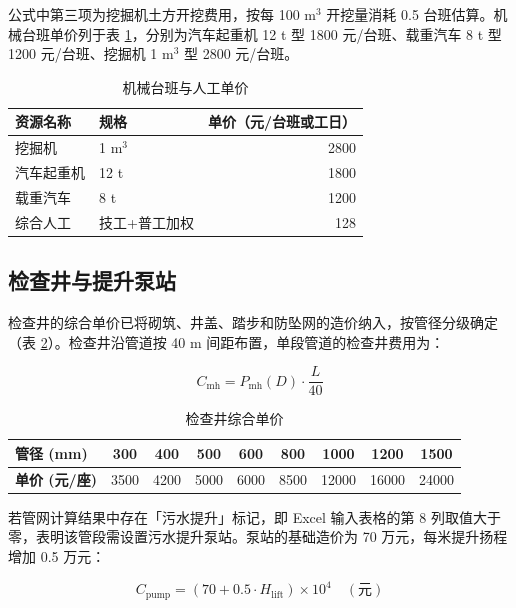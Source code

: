 \documentclass[12pt,a4paper]{ctexart}
\begin{document}
公式中第三项为挖掘机土方开挖费用，按每 100 m$^3$ 开挖量消耗 0.5 台班估算。机械台班单价列于表 \ref{tab:machine_price}，分别为汽车起重机 12 t 型 1800 元/台班、载重汽车 8 t 型 1200 元/台班、挖掘机 1 m$^3$ 型 2800 元/台班。

\begin{table}[htbp]
\centering
\caption{机械台班与人工单价}
\label{tab:machine_price}
\begin{tabular}{llr}
\toprule
\textbf{资源名称} & \textbf{规格} & \textbf{单价（元/台班或工日）} \\
\midrule
挖掘机      & 1 m$^3$           & 2800 \\
汽车起重机  & 12 t              & 1800 \\
载重汽车    & 8 t               & 1200 \\
综合人工    & 技工+普工加权     & 128 \\
\bottomrule
\end{tabular}
\end{table}

\subsection{检查井与提升泵站}

检查井的综合单价已将砌筑、井盖、踏步和防坠网的造价纳入，按管径分级确定（表 \ref{tab:manhole_price}）。检查井沿管道按 40 m 间距布置，单段管道的检查井费用为：

\begin{equation}
C_{\text{mh}} = P_{\text{mh}}(D) \cdot \frac{L}{40}
\end{equation}

\begin{table}[htbp]
\centering
\caption{检查井综合单价}
\label{tab:manhole_price}
\begin{tabular}{lcccccccc}
\toprule
\textbf{管径 (mm)} & 300 & 400 & 500 & 600 & 800 & 1000 & 1200 & 1500 \\
\midrule
\textbf{单价 (元/座)} & 3500 & 4200 & 5000 & 6000 & 8500 & 12000 & 16000 & 24000 \\
\bottomrule
\end{tabular}
\end{table}

若管网计算结果中存在「污水提升」标记，即 Excel 输入表格的第 8 列取值大于零，表明该管段需设置污水提升泵站。泵站的基础造价为 70 万元，每米提升扬程增加 0.5 万元：

\begin{equation}
C_{\text{pump}} = \left(70 + 0.5 \cdot H_{\text{lift}}\right) \times 10^4 \quad (\text{元})
\end{equation}
\end{document}
